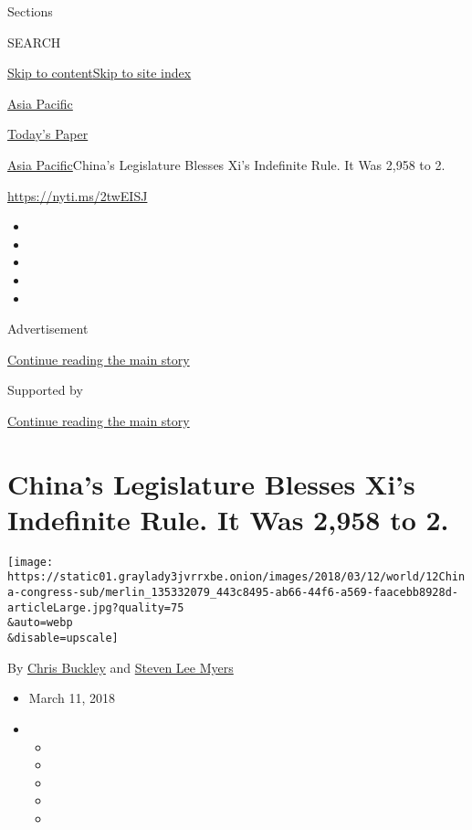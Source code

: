 Sections

SEARCH

\protect\hyperlink{site-content}{Skip to
content}\protect\hyperlink{site-index}{Skip to site index}

\href{https://www.nytimes3xbfgragh.onion/section/world/asia}{Asia
Pacific}

\href{https://myaccount.nytimes3xbfgragh.onion/auth/login?response_type=cookie\&client_id=vi}{}

\href{https://www.nytimes3xbfgragh.onion/section/todayspaper}{Today's
Paper}

\href{/section/world/asia}{Asia Pacific}\textbar{}China's Legislature
Blesses Xi's Indefinite Rule. It Was 2,958 to 2.

\url{https://nyti.ms/2twEISJ}

\begin{itemize}
\item
\item
\item
\item
\item
\end{itemize}

Advertisement

\protect\hyperlink{after-top}{Continue reading the main story}

Supported by

\protect\hyperlink{after-sponsor}{Continue reading the main story}

\hypertarget{chinas-legislature-blesses-xis-indefinite-rule-it-was-2958-to-2}{%
\section{China's Legislature Blesses Xi's Indefinite Rule. It Was 2,958
to
2.}\label{chinas-legislature-blesses-xis-indefinite-rule-it-was-2958-to-2}}

\texttt{[image: https://static01.graylady3jvrrxbe.onion/images/2018/03/12/world/12China-congress-sub/merlin\_135332079\_443c8495-ab66-44f6-a569-faacebb8928d-articleLarge.jpg?quality=75\\\&auto=webp\\\&disable=upscale]}

By \href{https://www.nytimes3xbfgragh.onion/by/chris-buckley}{Chris
Buckley} and
\href{https://www.nytimes3xbfgragh.onion/by/steven-lee-myers}{Steven Lee
Myers}

\begin{itemize}
\item
  March 11, 2018
\item
  \begin{itemize}
  \item
  \item
  \item
  \item
  \item
  \end{itemize}
\end{itemize}

